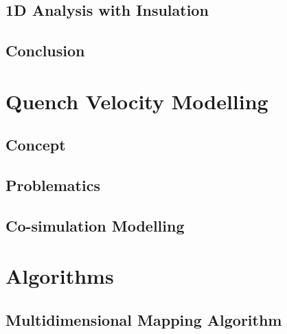 \documentclass{article}
\begin{document}
\subsection{1D Analysis with Insulation}
\label{subsection: 1D_quench_propagation_with_insulation}


\subsection{Conclusion}
\label{subsection: 1D_quench_propagation_conclusions}

 
\clearpage
\section{Quench Velocity Modelling}
\label{section:quench_velocity_modelling}

\subsection{Concept}
\label{subsection:quench_velocity_concept}


\subsection{Problematics}
\label{subsection:quench_velocity_problematics}


\subsection{Co-simulation Modelling}
\label{subsection:quench_velocity_cosimulation}


\clearpage
\section{Algorithms}
\label{section:algorithms}


\subsection{Multidimensional Mapping Algorithm}
\label{subsection:multidimensional_mapping_algorithm}

\end{document}
